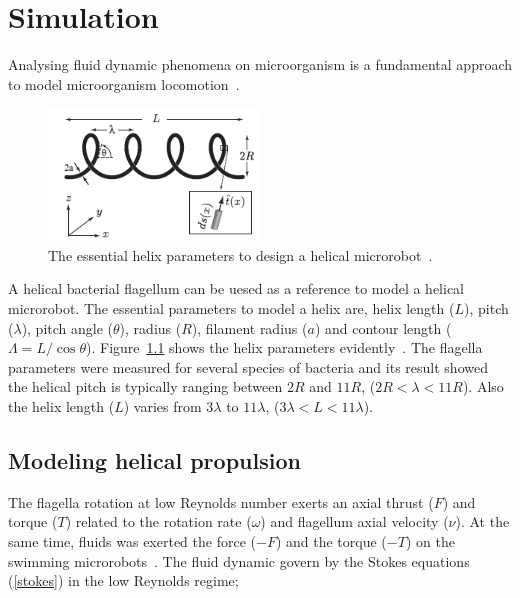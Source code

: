 \documentclass[12pt,a4paper,titlepage]{report}
\begin{document}





\chapter{Simulation}

Analysing fluid dynamic phenomena on microorganism is a fundamental approach to model microorganism
 locomotion~\citep{smith2009boundary}.


\begin{figure}
  \begin{center}
    \includegraphics[width=0.5\textwidth]{parameters}
  \caption{The essential helix parameters to design a helical microrobot~\citep{rodenborn2013propulsion}.}
  \label{parameters}
\end{center}
\end{figure}

A helical bacterial flagellum can be uesed as a reference to model a helical microrobot. The 
essential parameters to model a helix are, helix length ($L$), pitch ($\lambda$), pitch angle ($\theta$), 
radius ($R$), filament radius ($a$) and contour length ($\Lambda = L/ \cos \theta$). Figure~\ref{parameters} shows
the helix parameters evidently~\citep{rodenborn2013propulsion}. The flagella parameters were measured for
 several species of bacteria and its result showed the helical pitch is typically ranging between $2R$ and
$11R$, ($2R < \lambda < 11R$). Also the helix length ($L$) varies from $3\lambda$ to $11\lambda$, 
($3\lambda < L < 11\lambda$).


\section{Modeling helical propulsion}\label{maths}
The flagella rotation at low Reynolds number exerts an axial thrust ($F$) and torque ($T$) related to the
rotation rate ($\omega$) and flagellum axial velocity ($\nu$). At the same time, fluids was exerted the force
 ($-F$) and the torque ($-T$) on the swimming microrobots~\citep{purcell1997efficiency}. The fluid dynamic 
govern by the Stokes equations (\ref{stokes}) in the low Reynolds regime;
\end{document}
